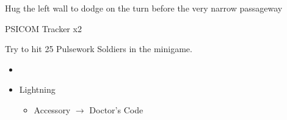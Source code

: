 Hug the left wall to dodge on the turn before the very narrow passageway

\begin{battle}{PSICOM Tracker x2}
 
\end{battle}
\newpage
Try to hit 25 Pulsework Soldiers in the minigame.



\begin{menu}
\begin{multicols}{2}
\begin{itemize}
    \paradigm
    \begin{itemize}
        \item {}%
{\paradigmline{\com}{\rav}{}}%
{\paradigmline[2]{\textit{\com}}{\textit{\syn}}{}}%
{\paradigmline{\med}{\med}{}}%
{\paradigmline{\rav}{\rav}{}}%
{\paradigmline{[\rav]}{\rav}{}}%
    \end{itemize}
    \equip
    \begin{itemize}
        \item Lightning
        \begin{itemize}
                \item Accessory $\rightarrow$ Doctor's Code
        \end{itemize}
    \end{itemize}
\end{itemize}
\end{multicols}
\end{menu}

